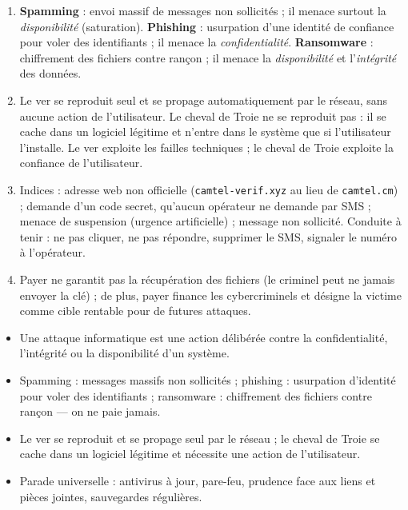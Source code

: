 \documentclass[11pt]{article}
\newcommand{\cle}[1]{{\popxbold\color{popdark}#1}}
\begin{document}
\begin{corrige}
\begin{enumerate}
  \item \textbf{Spamming} : envoi massif de messages non sollicités ; il menace surtout la \emph{disponibilité} (saturation). \textbf{Phishing} : usurpation d'une identité de confiance pour voler des identifiants ; il menace la \emph{confidentialité}. \textbf{Ransomware} : chiffrement des fichiers contre rançon ; il menace la \emph{disponibilité} et l'\emph{intégrité} des données.
  \item Le ver se reproduit seul et se propage automatiquement par le réseau, sans aucune action de l'utilisateur. Le cheval de Troie ne se reproduit pas : il se cache dans un logiciel légitime et n'entre dans le système que si l'utilisateur l'installe. Le ver exploite les failles techniques ; le cheval de Troie exploite la confiance de l'utilisateur.
  \item Indices : adresse web non officielle (\texttt{camtel-verif.xyz} au lieu de \texttt{camtel.cm}) ; demande d'un code secret, qu'aucun opérateur ne demande par SMS ; menace de suspension (urgence artificielle) ; message non sollicité. Conduite à tenir : ne pas cliquer, ne pas répondre, supprimer le SMS, signaler le numéro à l'opérateur.
  \item Payer ne garantit pas la récupération des fichiers (le criminel peut ne jamais envoyer la clé) ; de plus, payer finance les cybercriminels et désigne la victime comme cible rentable pour de futures attaques.
\end{enumerate}
\end{corrige}

\begin{aretenir}
\begin{itemize}
  \item Une \cle{attaque informatique} est une action délibérée contre la confidentialité, l'intégrité ou la disponibilité d'un système.
  \item \cle{Spamming} : messages massifs non sollicités ; \cle{phishing} : usurpation d'identité pour voler des identifiants ; \cle{ransomware} : chiffrement des fichiers contre rançon — on ne paie jamais.
  \item Le \cle{ver} se reproduit et se propage seul par le réseau ; le \cle{cheval de Troie} se cache dans un logiciel légitime et nécessite une action de l'utilisateur.
  \item Parade universelle : antivirus à jour, pare-feu, prudence face aux liens et pièces jointes, sauvegardes régulières.
\end{itemize}
\end{aretenir}
\end{document}
